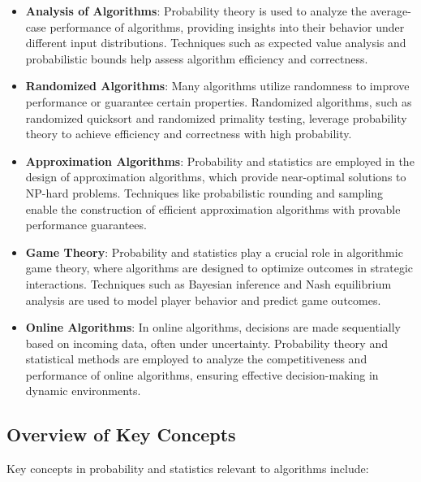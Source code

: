 \documentclass[12pt]{book} %
\begin{document}
\begin{itemize}
    \item \textbf{Analysis of Algorithms}: Probability theory is used to analyze the average-case performance of algorithms, providing insights into their behavior under different input distributions. Techniques such as expected value analysis and probabilistic bounds help assess algorithm efficiency and correctness.
    
    \item \textbf{Randomized Algorithms}: Many algorithms utilize randomness to improve performance or guarantee certain properties. Randomized algorithms, such as randomized quicksort and randomized primality testing, leverage probability theory to achieve efficiency and correctness with high probability.
    
    \item \textbf{Approximation Algorithms}: Probability and statistics are employed in the design of approximation algorithms, which provide near-optimal solutions to NP-hard problems. Techniques like probabilistic rounding and sampling enable the construction of efficient approximation algorithms with provable performance guarantees.
    
    \item \textbf{Game Theory}: Probability and statistics play a crucial role in algorithmic game theory, where algorithms are designed to optimize outcomes in strategic interactions. Techniques such as Bayesian inference and Nash equilibrium analysis are used to model player behavior and predict game outcomes.
    
    \item \textbf{Online Algorithms}: In online algorithms, decisions are made sequentially based on incoming data, often under uncertainty. Probability theory and statistical methods are employed to analyze the competitiveness and performance of online algorithms, ensuring effective decision-making in dynamic environments.
\end{itemize}

\subsection{Overview of Key Concepts}
Key concepts in probability and statistics relevant to algorithms include:
\end{document}
